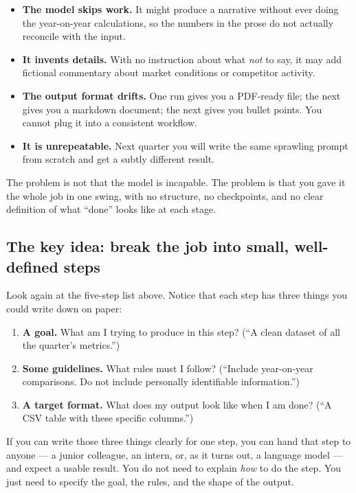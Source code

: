 \documentclass[12pt, a4paper]{article}
\begin{document}
\begin{itemize}[leftmargin=1.5em]
  \item \textbf{The model skips work.} It might produce a narrative without ever doing the year-on-year calculations, so the numbers in the prose do not actually reconcile with the input.
  \item \textbf{It invents details.} With no instruction about what \textit{not} to say, it may add fictional commentary about market conditions or competitor activity.
  \item \textbf{The output format drifts.} One run gives you a PDF-ready file; the next gives you a markdown document; the next gives you bullet points. You cannot plug it into a consistent workflow.
  \item \textbf{It is unrepeatable.} Next quarter you will write the same sprawling prompt from scratch and get a subtly different result.
\end{itemize}

The problem is not that the model is incapable. The problem is that you gave it the whole job in one swing, with no structure, no checkpoints, and no clear definition of what ``done'' looks like at each stage.

\subsection{The key idea: break the job into small, well-defined steps}

Look again at the five-step list above. Notice that each step has three things you could write down on paper:

\begin{enumerate}[leftmargin=1.5em]
  \item \textbf{A goal.} What am I trying to produce in this step? (``A clean dataset of all the quarter's metrics.'')
  \item \textbf{Some guidelines.} What rules must I follow? (``Include year-on-year comparisons. Do not include personally identifiable information.'')
  \item \textbf{A target format.} What does my output look like when I am done? (``A CSV table with these specific columns.'')
\end{enumerate}

If you can write those three things clearly for one step, you can hand that step to anyone --- a junior colleague, an intern, or, as it turns out, a language model --- and expect a usable result. You do not need to explain \textit{how} to do the step. You just need to specify the goal, the rules, and the shape of the output.
\end{document}
